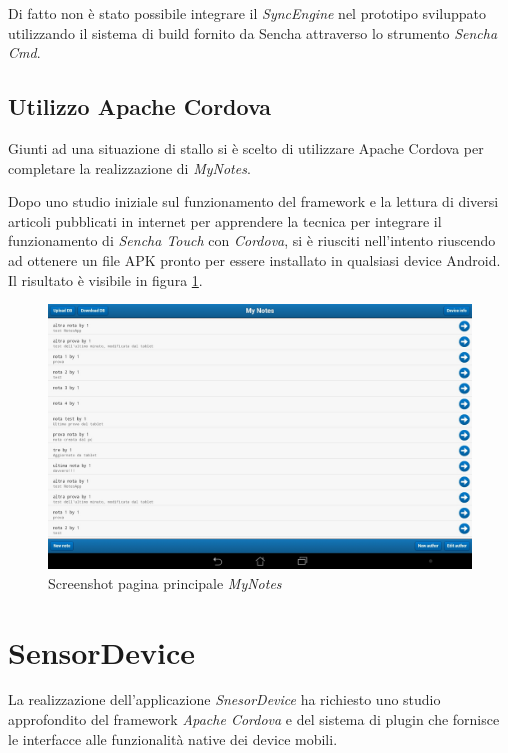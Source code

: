 Di fatto non è stato possibile integrare il \emph{SyncEngine} nel prototipo sviluppato utilizzando il sistema di build fornito da Sencha attraverso lo strumento \emph{Sencha Cmd}.

\subsection{Utilizzo Apache Cordova}
Giunti ad una situazione di stallo si è scelto di utilizzare Apache Cordova per completare la realizzazione di \emph{MyNotes}.

Dopo uno studio iniziale sul funzionamento del framework \cite{apache:cordova} e la lettura di diversi articoli pubblicati in internet \cite{andidog:packageSenchaPhonegap} \cite{sencha:senchaMVCphonegap} \cite{bgmemo:senchaPhonegap} per apprendere la tecnica per integrare il funzionamento di \emph{Sencha Touch} con \emph{Cordova}, si è riusciti nell'intento riuscendo ad ottenere un file \ac{APK} pronto per essere installato in qualsiasi device Android.
Il risultato è visibile in figura \ref{fig:screenshot mynotes}.

\begin{figure}[htb]
\centering
\includegraphics[scale=0.25]{gfx/screenshot/screen_MyNotes}
\caption{Screenshot pagina principale \emph{MyNotes}}
\label{fig:screenshot mynotes}
\end{figure}

\section{SensorDevice}
La realizzazione dell'applicazione \emph{SnesorDevice} ha richiesto uno studio approfondito del framework \emph{Apache Cordova} \cite{apache:cordova} e del sistema di plugin che fornisce le interfacce alle funzionalità native dei device mobili.


